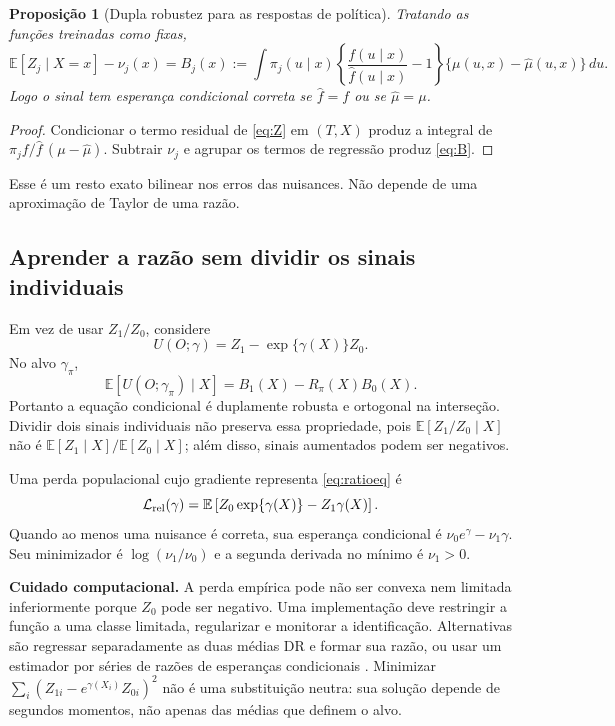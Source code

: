 \documentclass[11pt,a4paper]{article}
\newtheorem{theorem}{Proposição}[section]
\newcommand{\E}{\mathbb E}
\begin{document}
\begin{theorem}[Dupla robustez para as respostas de política]
\label{prop:stochasticdr}
Tratando as funções treinadas como fixas,
\begin{equation}
\E[Z_j\mid X=x]-\nu_j(x)
= B_j(x):=\int\pi_j(u\mid x)
\left\{\frac{f(u\mid x)}{\hat f(u\mid x)}-1\right\}
\{\mu(u,x)-\hat\mu(u,x)\}\,du.
\label{eq:B}
\end{equation}
Logo o sinal tem esperança condicional correta se $\hat f=f$ ou se $\hat\mu=\mu$.
\end{theorem}
\begin{proof}
Condicionar o termo residual de \eqref{eq:Z} em $(T,X)$ produz a integral de $\pi_j f/\hat f\,(\mu-\hat\mu)$. Subtrair $\nu_j$ e agrupar os termos de regressão produz \eqref{eq:B}.
\end{proof}
Esse é um resto exato bilinear nos erros das nuisances. Não depende de uma aproximação de Taylor de uma razão.

\subsection{Aprender a razão sem dividir os sinais individuais}
Em vez de usar $Z_1/Z_0$, considere
\begin{equation}
U(O;\gamma)=Z_1-\exp\{\gamma(X)\}Z_0.
\label{eq:ratioeq}
\end{equation}
No alvo $\gamma_\pi$,
\begin{equation}
\E[U(O;\gamma_\pi)\mid X]=B_1(X)-R_\pi(X)B_0(X).
\label{eq:ratiobias}
\end{equation}
Portanto a equação condicional é duplamente robusta e ortogonal na interseção. Dividir dois sinais individuais não preserva essa propriedade, pois $\E[Z_1/Z_0\mid X]$ não é $\E[Z_1\mid X]/\E[Z_0\mid X]$; além disso, sinais aumentados podem ser negativos.

Uma perda populacional cujo gradiente representa \eqref{eq:ratioeq} é
\begin{equation}
\mathcal L_{\rm rel}(\gamma)
=\E\left[Z_0\exp\{\gamma(X)\}-Z_1\gamma(X)\right].
\label{eq:relloss}
\end{equation}
Quando ao menos uma nuisance é correta, sua esperança condicional é
$\nu_0e^{\gamma}-\nu_1\gamma$. Seu minimizador é $\log(\nu_1/\nu_0)$ e a segunda derivada no mínimo é $\nu_1>0$.

\noindent\textbf{Cuidado computacional.} A perda empírica pode não ser convexa nem limitada inferiormente porque $Z_0$ pode ser negativo. Uma implementação deve restringir a função a uma classe limitada, regularizar e monitorar a identificação. Alternativas são regressar separadamente as duas médias DR e formar sua razão, ou usar um estimador por séries de razões de esperanças condicionais \cite{shinoda2022}. Minimizar $\sum_i(Z_{1i}-e^{\gamma(X_i)}Z_{0i})^2$ não é uma substituição neutra: sua solução depende de segundos momentos, não apenas das médias que definem o alvo.
\end{document}
